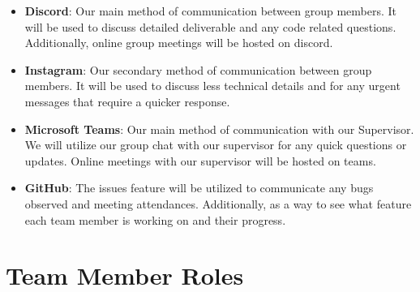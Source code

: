 \documentclass{article}
\begin{document}
\begin{itemize}
    \item \textbf{Discord}: Our main method of communication between group members. It will be used to discuss detailed deliverable and any code related questions. Additionally, online group meetings will be hosted on discord. 
    \item \textbf{Instagram}: Our secondary method of communication between group members. It will be used to discuss less technical details and for any urgent messages that require a quicker response. 
    \item \textbf{Microsoft Teams}: Our main method of communication with our Supervisor. We will utilize our group chat with our supervisor for any quick questions or updates. Online meetings with our supervisor will be hosted on teams.
    \item \textbf{GitHub}: The issues feature will be utilized to communicate any bugs observed and meeting attendances. Additionally, as a way to see what feature each team member is working on and their progress. 
\end{itemize}



\section{Team Member Roles}
\end{document}
